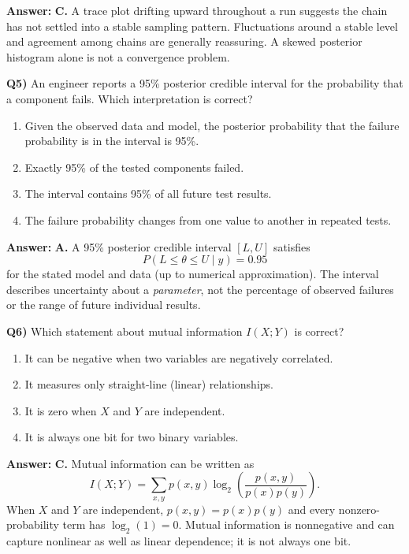 \documentclass[12pt]{article}
\newenvironment{solution}{\par\smallskip\begingroup\color{blue}\noindent\textbf{Answer: }\smallskip}{\par\endgroup\medskip}
\newcommand{\question}[2]{\vspace{0.7em}\noindent\textbf{Q#1)}}
\begin{document}
\begin{solution}
\textbf{C.} A trace plot drifting upward throughout a run suggests the chain has not settled into a stable sampling pattern.
Fluctuations around a stable level and agreement among chains are generally reassuring. A skewed posterior histogram alone is not a convergence problem.
\end{solution}

\question{5}{}
An engineer reports a 95\% posterior credible interval for the probability that a component fails. Which interpretation is correct?
\begin{enumerate}[label=\Alph*.,nosep]
\item Given the observed data and model, the posterior probability that the failure probability is in the interval is 95\%.
\item Exactly 95\% of the tested components failed.
\item The interval contains 95\% of all future test results.
\item The failure probability changes from one value to another in repeated tests.
\end{enumerate}

\begin{solution}
\textbf{A.} A 95\% posterior credible interval $[L,U]$ satisfies
\[P(L\leq\theta\leq U\mid y)=0.95\]
for the stated model and data (up to numerical approximation).
The interval describes uncertainty about a \emph{parameter}, not the percentage of observed failures or the range of future individual results.
\end{solution}

\question{6}{}
Which statement about mutual information $I(X;Y)$ is correct?
\begin{enumerate}[label=\Alph*.,nosep]
\item It can be negative when two variables are negatively correlated.
\item It measures only straight-line (linear) relationships.
\item It is zero when $X$ and $Y$ are independent.
\item It is always one bit for two binary variables.
\end{enumerate}

\begin{solution}
\textbf{C.} Mutual information can be written as
\[I(X;Y)=\sum_{x,y}p(x,y)\log_2\!\left(\frac{p(x,y)}{p(x)p(y)}\right).\]
When $X$ and $Y$ are independent, $p(x,y)=p(x)p(y)$ and every nonzero-probability term has $\log_2(1)=0$.
Mutual information is nonnegative and can capture nonlinear as well as linear dependence; it is not always one bit.
\end{solution}
\end{document}
